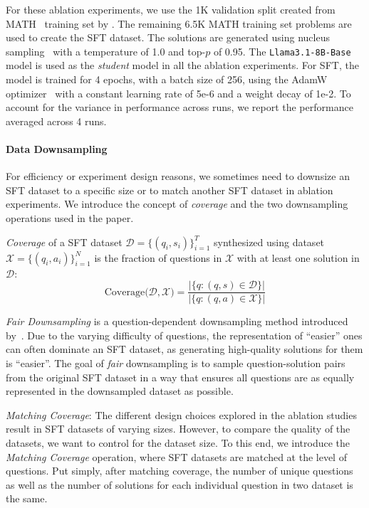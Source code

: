 For these ablation experiments, we use the 1K validation split created from MATH~\citep{hendrycks2021measuringmathematicalproblemsolving} training set by \citet{toshniwal2024openmathinstruct}. The remaining 6.5K MATH training set problems are used to create the SFT dataset. 
The solutions are generated using nucleus sampling~\citep{Holtzman2020The} with a temperature of 1.0 and top-$p$ of 0.95.  
The \texttt{Llama3.1-8B-Base} model is used as the \emph{student} model in all the ablation experiments. 
For SFT, the model is trained for 4 epochs, with a batch size of 256, using the AdamW optimizer~\citep{Loshchilov2019DecoupledWD} with a constant learning rate of 5e-6 and a weight decay of 1e-2. 
To account for the variance in performance across runs, we report the performance averaged across 4 runs.   



\paragraph{Data Downsampling}
For efficiency or experiment design reasons, we sometimes need to downsize an SFT dataset to a specific size or to match another SFT dataset in ablation experiments. We introduce the concept of \emph{coverage} and the two downsampling operations used in the paper.

\emph{Coverage} of a SFT dataset $\mathcal{D}=\{\left(q_i, s_i\right)\}_{i=1}^{T}$ synthesized using dataset $\mathcal{X} = \{\left(q_i, a_i\right)\}_{i=1}^N$ is the fraction of questions in $\mathcal{X}$ with at least one solution in $\mathcal{D}$:
\[ \text{Coverage(}\mathcal{D}, \mathcal{X}\text{)} = \frac{|\{q : \left(q, s\right) \in \mathcal{D}\}|}{|\{q : \left(q, a\right) \in \mathcal{X}\}|} \]


\emph{Fair Downsampling} is a question-dependent downsampling method introduced by~\citet{toshniwal2024openmathinstruct}. 
Due to the varying difficulty of questions, the representation of ``easier'' ones can often dominate an SFT dataset, as generating high-quality solutions for them is ``easier''.  
The goal of \emph{fair} downsampling is to sample question-solution pairs from the original SFT dataset in a way that ensures all questions are as equally represented in the downsampled dataset as possible. 

\emph{Matching Coverage}:
The different design choices explored in the ablation studies result in SFT datasets of varying sizes. 
However, to compare the quality of the datasets, we want to control for the dataset size. 
To this end, we introduce the \emph{Matching Coverage} operation, where SFT datasets are matched at the level of questions. Put simply, after matching coverage, the number of unique questions as well as the number of solutions for each individual question in two dataset is the same.

